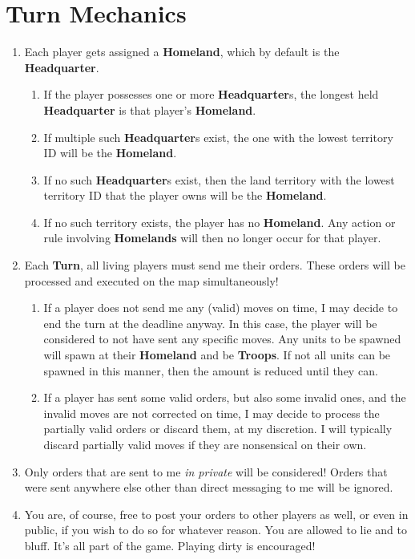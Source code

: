 \documentclass[10pt,openright,a4paper,openany]{article}
\newcommand{\term}[1]{\textbf{\color{purple} #1}}
\newcommand{\headquarter}{\term{Headquarter}}
\begin{document}
\section{Turn Mechanics}\label{sec:turn}
\begin{enumerate}
	\item \label{rule:homeland}Each player gets assigned a \term{Homeland}, which by default is the \term{Headquarter}.
	\begin{enumerate}
		\item If the player possesses one or more \headquarter{}{}s, the longest held \headquarter{} is that player's \term{Homeland}.
		\item If multiple such \headquarter{}{}s exist, the one with the lowest territory ID will be the \term{Homeland}.
		\item If no such \headquarter{}{}s exist, then the land territory with the lowest territory ID that the player owns will be the \term{Homeland}.
		\item If no such territory exists, the player has no \term{Homeland}. Any action or rule involving \term{Homelands} will then no longer occur for that player.
	\end{enumerate}
	\item Each \term{Turn}, all living players must send me their orders. These orders will be processed and executed on the map simultaneously!
	\begin{enumerate}
		\item If a player does not send me any (valid) moves on time, I may decide to end the turn at the deadline anyway. In this case, the player will be considered to not have sent any specific moves. Any units to be spawned will spawn at their \term{Homeland} and be \term{Troops}. If not all units can be spawned in this manner, then the amount is reduced until they can.
		\item \label{rule:invalid-moves}If a player has sent some valid orders, but also some invalid ones, and the invalid moves are not corrected on time, I may decide to process the partially valid orders or discard them, at my discretion. I will typically discard partially valid moves if they are nonsensical on their own.
	\end{enumerate}
	\item Only orders that are sent to me \emph{in private} will be considered! Orders that were sent anywhere else other than direct messaging to me will be ignored.
	\item \label{rule:play-dirty} You are, of course, free to post your orders to other players as well, or even in public, if you wish to do so for whatever reason. You are allowed to lie and to bluff. It's all part of the game. Playing dirty is encouraged!

\end{enumerate}
\end{document}
